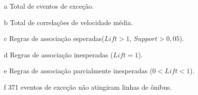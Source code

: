 \documentclass[
	12pt,				%
	oneside,			%
	a4paper,			%
	english,			%
	brazil				%
	]{abntex2ppgsi}
\begin{document}
{{\begin{apendicesenv}
\begin{table}[!htb]
\begin{threeparttable}
\begin{tablenotes}
            \item[a] Total de eventos de exceção.
            \item[b] Total de correlações de velocidade média.
            \item[c] Regras de associação esperadas($Lift > 1$, $Support > 0,05$).
            \item[d] Regras de associação inesperadas ($Lift = 1$).
            \item[e] Regras de associação parcialmente inesperadas ($0 < Lift < 1$).
            \item[f] 371 eventos de exceção não atingiram linhas de ônibus.
        \end{tablenotes}
\end{threeparttable}
\end{table}


\end{apendicesenv}}}
\end{document}
